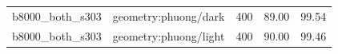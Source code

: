\begin{longtable}{l>{\raggedright\arraybackslash}p{.42\linewidth}rrr}
b8000\_\allowbreak{}both\_\allowbreak{}s303 & %
geometry:phuong/dark & %
400 & %
89.00 & %
99.54 \\ %

b8000\_\allowbreak{}both\_\allowbreak{}s303 & %
geometry:phuong/light & %
400 & %
90.00 & %
99.46 \\ %


\end{longtable}
